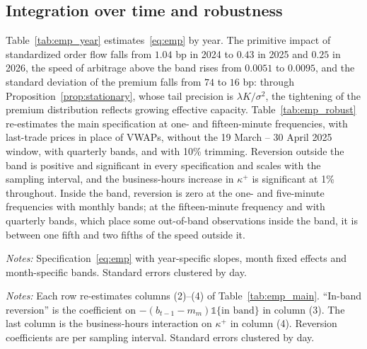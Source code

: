 \documentclass[12pt]{article}
\theoremstyle{definition}
\theoremstyle{remark}
\begin{document}
\subsection{Integration over time and robustness}

Table~\ref{tab:emp_year} estimates~\eqref{eq:emp} by year. The primitive impact of standardized order flow falls from $1.04$ bp in 2024 to $0.43$ in 2025 and $0.25$ in 2026, the speed of arbitrage above the band rises from $0.0051$ to $0.0095$, and the standard deviation of the premium falls from $74$ to $16$ bp: through Proposition~\ref{prop:stationary}, whose tail precision is $\lambda K/\sigma^2$, the tightening of the premium distribution reflects growing effective capacity. Table~\ref{tab:emp_robust} re-estimates the main specification at one- and fifteen-minute frequencies, with last-trade prices in place of VWAPs, without the 19 March -- 30 April 2025 window, with quarterly bands, and with 10\% trimming. Reversion outside the band is positive and significant in every specification and scales with the sampling interval, and the business-hours increase in $\kappa^+$ is significant at 1\% throughout. Inside the band, reversion is zero at the one- and five-minute frequencies with monthly bands; at the fifteen-minute frequency and with quarterly bands, which place some out-of-band observations inside the band, it is between one fifth and two fifths of the speed outside it.

\begin{table}[t]
\centering
\caption{\textbf{Estimates by year}}
\label{tab:emp_year}
\footnotesize
\resizebox{\ifdim\width>\textwidth\textwidth\else\width\fi}{!}{}
\begin{minipage}{0.95\textwidth}
\footnotesize\vspace{4pt}
\emph{Notes:} Specification~\eqref{eq:emp} with year-specific slopes, month fixed effects and month-specific bands. Standard errors clustered by day.
\end{minipage}
\end{table}


\begin{table}[t]
\centering
\caption{\textbf{Robustness}}
\label{tab:emp_robust}
\footnotesize
\resizebox{\ifdim\width>\textwidth\textwidth\else\width\fi}{!}{}
\begin{minipage}{0.95\textwidth}
\footnotesize\vspace{4pt}
\emph{Notes:} Each row re-estimates columns (2)--(4) of Table~\ref{tab:emp_main}. ``In-band reversion'' is the coefficient on $-(b_{t-1}-m_m)\mathbb 1\{\text{in band}\}$ in column (3). The last column is the business-hours interaction on $\kappa^+$ in column (4). Reversion coefficients are per sampling interval. Standard errors clustered by day.
\end{minipage}
\end{table}
\end{document}
